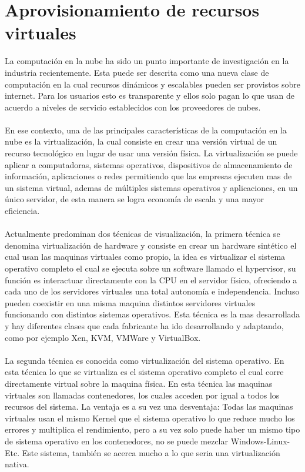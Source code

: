
\chapter{Aprovisionamiento de recursos virtuales}

\label{aprmaqvir}
La computación en la nube ha sido un punto importante de investigación en la industria recientemente. Esta puede ser descrita como una nueva clase de computación en la cual recursos dinámicos y escalables pueden ser provistos sobre internet. Para los usuarios esto es transparente y ellos solo pagan lo que usan de acuerdo a niveles de servicio establecidos con los proveedores de nubes.\\
\\
En ese contexto, una de las principales características de la computación en la nube es la virtualización, la cual consiste en crear una versión virtual de un recurso tecnológico en lugar de usar una versión física. La virtualización se puede aplicar a computadoras, sistemas operativos, dispositivos de almacenamiento de información, aplicaciones o redes permitiendo que las empresas ejecuten mas de un sistema virtual, ademas de múltiples sistemas operativos y aplicaciones, en un único servidor, de esta manera se logra economía de escala y una mayor eficiencia.\\
\\
Actualmente predominan dos técnicas de visualización, la primera técnica se denomina virtualización de hardware y consiste en crear un hardware sintético el cual usan las maquinas virtuales como propio, la idea es virtualizar el sistema operativo completo el cual se ejecuta sobre un software llamado el hypervisor, su función es interactuar directamente con la CPU en el servidor físico, ofreciendo a cada uno de los servidores virtuales una total autonomía e independencia. Incluso pueden coexistir en una misma maquina distintos servidores virtuales funcionando con distintos sistemas operativos. Esta técnica es la mas desarrollada y hay diferentes clases que cada fabricante ha ido desarrollando y adaptando, como por ejemplo Xen, KVM, VMWare y VirtualBox.\\
\\
La segunda técnica es conocida como virtualización del sistema operativo. En esta técnica lo que se virtualiza es el sistema operativo completo el cual corre directamente virtual sobre la maquina física. En esta técnica las maquinas virtuales son llamadas contenedores, los cuales acceden por igual a todos los recursos del sistema. La ventaja es a su vez una desventaja: Todas las maquinas virtuales usan el mismo Kernel que el sistema operativo lo que reduce mucho los errores y multiplica el rendimiento, pero a su vez solo puede haber un mismo tipo de sistema operativo en los contenedores, no se puede mezclar Windows-Linux-Etc. Este sistema, también se acerca mucho a lo que seria una virtualización nativa.\\
